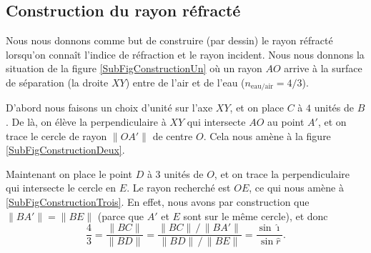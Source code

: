 \documentclass[a4paper,12pt]{book}
\newcommand{\pstTransHom}[5]{%
\pstTranslation{#1}{#2}{#3}[inter]
\pstHomO[HomCoef=#4]{#3}{inter}[#5]
}
\newcommand{\pstDecompForce}[8]{%
  \psset{PointSymbol=none, PointName=none}
\pstTranslation{#3}{#4}{#1}[ibBu]
\pstTranslation{#5}{#6}{#1}[ibBd]

\pstTranslation{#3}{#4}{#2}[jbBu]
\pstTranslation{#5}{#6}{#2}[jbBd]

\pstInterLL{#2}{jbBd}{#1}{ibBu}{#7}
\pstInterLL{#2}{jbBu}{#1}{ibBd}{#8}
}
\newcommand{\pstDioptre}[8][Diinter]{%
  \psset{PointSymbol=none, PointName=none}
	\pstGeonode(#2){DiO}(#3){DiP}(#4){DiRi}
	\pstRotation[RotAngle=90]{DiO}{DiP}[DiQ]				%
   	\pstDecompForce{DiO}{DiRi}{DiO}{DiP}{DiO}{DiQ}{DiRix}{DiRiy}		%
  \FPeval{Dicoefrel}{#5/#6}
	\pstTransHom{DiRi}{DiRiy}{DiO}{\Dicoefrel}{DiRex}			%

   	\pstTranslation{DiO}{DiRex}{DiQ}[DiR]
   	\pstInterLC{DiRex}{DiR}{DiO}{DiRi}{#8}{#1}				%

	\pstTranslation{DiRi}{DiRiy}{DiRiy}[#7]					%
}
\theoremstyle{mes_exemples}	\newtheorem{exemple}[numtho]{Exemple}
\theoremstyle{mes_tho}
\begin{document}
\subsection{Construction du rayon réfracté}

Nous nous donnons comme but de construire (par dessin) le rayon réfracté lorsqu'on connaît l'indice de réfraction et le rayon incident. Nous nous donnons la situation de la figure \ref{SubFigConstructionUn} où un rayon $AO$ arrive à la surface de séparation (la droite $XY$) entre de l'air et de l'eau ($n_{\text{eau/air}}=4/3$).

D'abord nous faisons un choix d'unité sur l'axe $XY$, et on place $C$ à $4$ unités de $B$. De là, on élève la perpendiculaire à $XY$ qui intersecte $AO$ au point $A'$, et on trace le cercle de rayon $\| OA' \|$ de centre $O$. Cela nous amène à la figure \ref{SubFigConstructionDeux}.

Maintenant on place le point $D$ à $3$ unités de $O$, et on trace la perpendiculaire qui intersecte le cercle en $E$. Le rayon recherché est $OE$, ce qui nous amène à \ref{SubFigConstructionTrois}. En effet, nous avons par construction que $\| BA' \|=\| BE \|$ (parce que $A'$ et $E$ sont sur le même cercle), et donc
\[ 
  \frac{ 4 }{ 3 }=\frac{ \| BC \| }{ \| BD \| }=\frac{ \| BC \|\,/\,\| BA' \| }{ \| BD \|\,/\,\| BE \| }=\frac{ \sin\hat\imath }{ \sin\hat r }.
\]


\newcommand{\PreFigConstruction}{%
\pstGeonode(0,0){O}(2,0){P}
\pstRotation[RotAngle=90]{O}{P}[Qi]
\pstHomO[HomCoef=0.5]{O}{Qi}[Q]
\pstRotation[RotAngle=180]{O}{P}[R]
\pstHomO[HomCoef=-1]{O}{Q}[S]
\pstRotation[RotAngle=30]{O}{P}[Pi]		%
\pstHomO[HomCoef=1.5]{O}{Pi}[Pil]
\pstHomO[HomCoef=1.2]{O}{R}[Rl]
\pstHomO[HomCoef=1.2]{O}{P}[Pl]

\pstTransHom{O}{R}{Q}{1}{T}
\pstTransHom{O}{P}{S}{1}{U}

\pstDecompForce{O}{Pi}{O}{P}{O}{Q}{C}{C'}
\pstHomO[HomCoef=-0.75]{O}{C}[D]
\pstTransHom{O}{S}{D}{1}{El}
\pstInterLC{D}{El}{O}{Pi}{E'}{E}

    \pstDioptre{O}{P}{Pi}{1}{1.333}{Rs}{Re}	%
}
\end{document}
